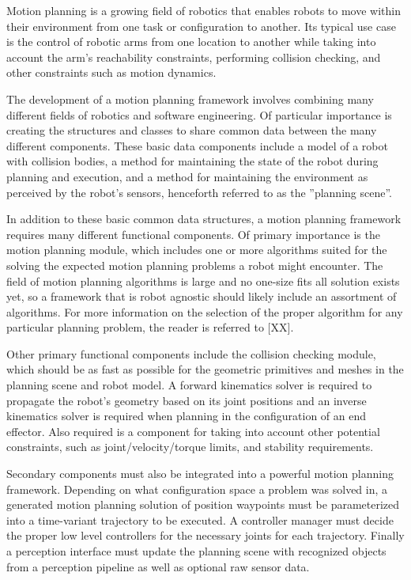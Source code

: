 \documentclass[10pt,journal,compsoc]{joser1}
\begin{document}
{Motion planning is a growing field of robotics that enables robots to move within their environment from one task or configuration to another. Its typical use case is the control of robotic arms from one location to another while taking into account the arm's reachability constraints, performing collision checking, and other constraints such as motion dynamics. 

The development of a motion planning framework involves combining many different fields of robotics and software engineering. Of particular importance is creating the structures and classes to share common data between the many different components. These basic data components include a model of a robot with collision bodies, a method for maintaining the state of the robot during planning and execution, and a method for maintaining the environment as perceived by the robot's sensors, henceforth referred to as the ''planning scene''. 

In addition to these basic common data structures, a motion planning framework requires many different functional components. Of primary importance is the motion planning module, which includes one or more algorithms suited for the solving the expected motion planning problems a robot might encounter. The field of motion planning algorithms is large and no one-size fits all solution exists yet, so a framework that is robot agnostic should likely include an assortment of algorithms. For more information on the selection of the proper algorithm for any particular planning problem, the reader is referred to [XX].

Other primary functional components include the collision checking module, which should be as fast as possible for the geometric primitives and meshes in the planning scene and robot model. A forward kinematics solver is required to propagate the robot's geometry based on its joint positions and an inverse kinematics solver is required when planning in the configuration of an end effector. Also required is a component for taking into account other potential constraints, such as joint/velocity/torque limits, and stability requirements. 

Secondary components must also be integrated into a powerful motion planning framework. Depending on what configuration space a problem was solved in, a generated motion planning solution of position waypoints must be parameterized into a time-variant trajectory to be executed. A controller manager must decide the proper low level controllers for the necessary joints for each trajectory. Finally a perception interface must update the planning scene with recognized objects from a perception pipeline as well as optional raw sensor data.

}
\end{document}
